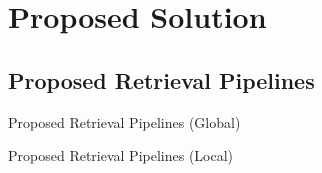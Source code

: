 \documentclass[mathserif]{beamer}
\begin{document}
\section{Proposed Solution}
\subsection{Proposed Retrieval Pipelines}
\begin{frame}{Proposed Retrieval Pipelines (Global)}
    \begin{figure}
    \end{figure}
\end{frame}

\begin{frame}{Proposed Retrieval Pipelines (Local)}
    \begin{figure}
    \end{figure}
\end{frame}
\end{document}
